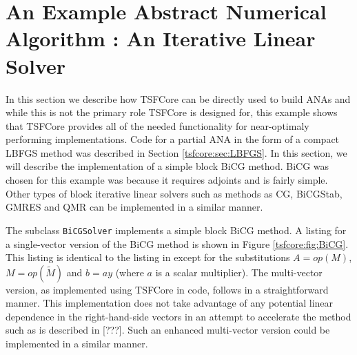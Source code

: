 %
\section{An Example Abstract Numerical Algorithm : An Iterative Linear Solver}
\label{tsfcore:sec:ANA_iter_solver_example}
%

In this section we describe how TSFCore can be directly used to build
ANAs and while this is not the primary role TSFCore is designed for,
this example shows that TSFCore provides all of the needed
functionality for near-optimaly performing implementations.  Code for
a partial ANA in the form of a compact LBFGS method was described in
Section {}\ref{tsfcore:sec:LBFGS}.  In this section, we will describe
the implementation of a simple block BiCG
{}\cite{ref:tmpls_for_iter_systems} method.  BiCG was chosen for this
example was because it requires adjoints and is fairly simple.  Other
types of block iterative linear solvers such as methods as CG,
BiCGStab, GMRES and QMR {}\cite{ref:tmpls_for_iter_systems} can be
implemented in a similar manner.

The subclass {}\texttt{BiCG\-Solver} implements a simple block BiCG
method.  A listing for a single-vector version of the BiCG method is
shown in Figure {}\ref{tsfcore:fig:BiCG}.  This listing is identical
to the listing in {}\cite{ref:tmpls_for_iter_systems} except for the
substitutions $A = op(M)$, $M = op(\tilde{M})$ and $b =a y$ (where $a$
is a scalar multiplier).  The multi-vector version, as implemented
using TSFCore in code, follows in a straightforward manner.  This
implementation does not take advantage of any potential linear
dependence in the right-hand-side vectors in an attempt to accelerate
the method such as is described in [???].  Such an enhanced
multi-vector version could be implemented in a similar manner.

